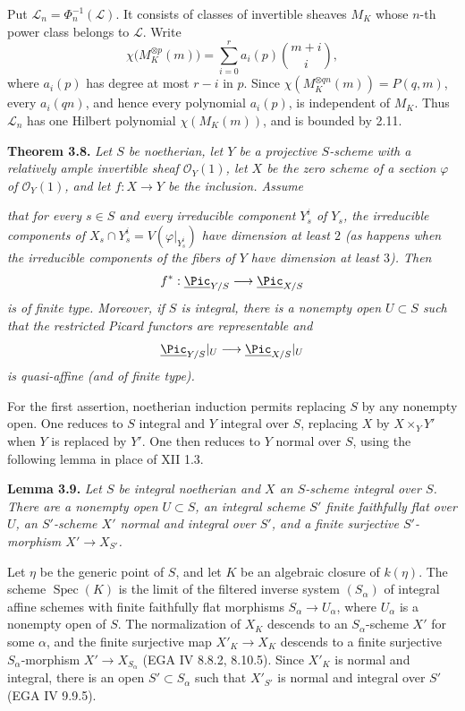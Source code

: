 Put \(\mathscr L_n=\Phi_n^{-1}(\mathscr L)\). It consists of classes of
invertible sheaves \(M_K\) whose \(n\)-th power class belongs to
\(\mathscr L\). Write
\[
\chi\bigl(M_K^{\otimes p}(m)\bigr)
=\sum_{i=0}^{r}a_i(p)\binom{m+i}{i},
\]
where \(a_i(p)\) has degree at most \(r-i\) in \(p\). Since
\(\chi(M_K^{\otimes qn}(m))=P(q,m)\), every \(a_i(qn)\), and hence every
polynomial \(a_i(p)\), is independent of \(M_K\). Thus \(\mathscr L_n\)
has one Hilbert polynomial \(\chi(M_K(m))\), and is bounded by 2.11.

\textbf{Theorem 3.8.} \emph{Let \(S\) be noetherian, let \(Y\) be a
projective \(S\)-scheme with a relatively ample invertible sheaf
\(\mathcal O_Y(1)\), let \(X\) be the zero scheme of a section \(\varphi\)
of \(\mathcal O_Y(1)\), and let \(f:X\to Y\) be the inclusion. Assume}

\emph{that for every \(s\in S\) and every irreducible component \(Y_s^i\)
of \(Y_s\), the irreducible components of
\(X_s\cap Y_s^i=V(\varphi|_{Y_s^i})\) have dimension at least \(2\)
(as happens when the irreducible components of the fibers of \(Y\) have
dimension at least \(3\)). Then}
\[
f^*:\underline{\Pic}_{Y/S}\longrightarrow\underline{\Pic}_{X/S}
\]
\emph{is of finite type. Moreover, if \(S\) is integral, there is a
nonempty open \(U\subset S\) such that the restricted Picard functors
are representable and}
\[
\underline{\Pic}_{Y/S}|_U\longrightarrow\underline{\Pic}_{X/S}|_U
\]
\emph{is quasi-affine (and of finite type).}

For the first assertion, noetherian induction permits replacing \(S\) by
any nonempty open. One reduces to \(S\) integral and \(Y\) integral over
\(S\), replacing \(X\) by \(X\times_Y Y'\) when \(Y\) is replaced by
\(Y'\). One then reduces to \(Y\) normal over \(S\), using the following
lemma in place of XII 1.3.

\textbf{Lemma 3.9.} \emph{Let \(S\) be integral noetherian and \(X\) an
\(S\)-scheme integral over \(S\). There are a nonempty open \(U\subset S\),
an integral scheme \(S'\) finite faithfully flat over \(U\), an
\(S'\)-scheme \(X'\) normal and integral over \(S'\), and a finite
surjective \(S'\)-morphism \(X'\to X_{S'}\).}

Let \(\eta\) be the generic point of \(S\), and let \(K\) be an algebraic
closure of \(k(\eta)\). The scheme \(\operatorname{Spec}(K)\) is the
limit of the filtered inverse system \((S_\alpha)\) of integral affine
schemes with finite faithfully flat morphisms
\(S_\alpha\to U_\alpha\), where \(U_\alpha\) is a nonempty open of \(S\).
The normalization of \(X_K\) descends to an \(S_\alpha\)-scheme \(X'\) for
some \(\alpha\), and the finite surjective map \(X'_K\to X_K\) descends
to a finite surjective \(S_\alpha\)-morphism \(X'\to X_{S_\alpha}\)
(EGA IV 8.8.2, 8.10.5). Since \(X'_K\) is normal and integral, there is
an open \(S'\subset S_\alpha\) such that \(X'_{S'}\) is normal and
integral over \(S'\) (EGA IV 9.9.5).

